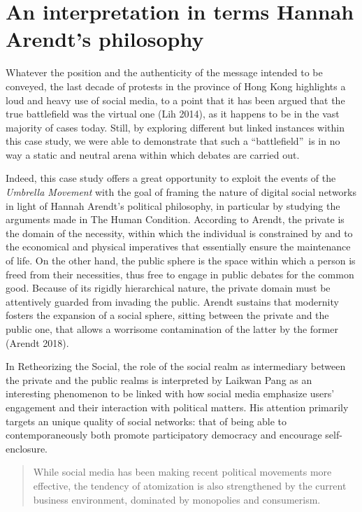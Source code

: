 \documentclass[
  a4paper,
]{book}
\begin{document}
\hypertarget{an-interpretation-in-terms-hannah-arendts-philosophy}{%
\section{An interpretation in terms Hannah Arendt's philosophy}\label{an-interpretation-in-terms-hannah-arendts-philosophy}}

Whatever the position and the authenticity of the message intended to be conveyed, the last decade of protests in the province of Hong Kong highlights a loud and heavy use of social media, to a point that it has been argued that the true battlefield was the virtual one {(Lih 2014)}, as it happens to be in the vast majority of cases today. Still, by exploring different but linked instances within this case study, we were able to demonstrate that such a ``battlefield''~is in no way a static and neutral arena within which debates are carried out.

Indeed, this case study offers a great opportunity to exploit the events of the \emph{Umbrella Movement} with the goal of framing the nature of digital social networks in light of Hannah Arendt's political philosophy, in particular by studying the arguments made in The Human Condition. According to Arendt, the private is the domain of the necessity, within which the individual is constrained by and to the economical and physical imperatives that essentially ensure the maintenance of life. On the other hand, the public sphere is the space within which a person is freed from their necessities, thus free to engage in public debates for the common good. Because of its rigidly hierarchical nature, the private domain must be attentively guarded from invading the public. Arendt sustains that modernity fosters the expansion of a social sphere, sitting between the private and the public one, that allows a worrisome contamination of the latter by the former {(Arendt 2018)}.

In Retheorizing the Social, the role of the social realm as intermediary between the private and the public realms is interpreted by Laikwan Pang as an interesting phenomenon to be linked with how social media emphasize users' engagement and their interaction with political matters. His attention primarily targets an unique quality of social networks: that of being able to contemporaneously both promote participatory democracy and encourage self-enclosure.

\begin{quote}
While social media has been making recent political movements more effective, the tendency of atomization is also strengthened by the current business environment, dominated by monopolies and consumerism.
\end{quote}
\end{document}
